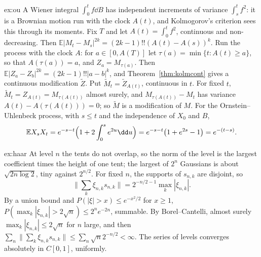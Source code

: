 \begin{solution}{ex:ou}
\idea A Wiener integral $\int_0^tf\dd B$ has independent increments of variance $\int_s^tf^2$: it is a Brownian motion run with the clock $A(t)$, and Kolmogorov's criterion sees this through its moments.
\writeup Fix $T$ and let $A(t)=\int_0^tf^2$, continuous and non-decreasing. Then $\mathbb E|M_t-M_s|^{2k}=(2k-1)!!(A(t)-A(s))^k$. Run the process with the clock $A$: for $a\in[0,A(T)]$ let
$\tau(a)=\min\{t:A(t)\ge a\}$, so that $A(\tau(a))=a$, and $Z_a=M_{\tau(a)}$. Then $\mathbb E|Z_a-Z_b|^{2k}=(2k-1)!!|a-b|^k$, and Theorem~\ref{thm:kolmcont} gives a continuous modification $\tilde Z$. Put
$\tilde M_t=\tilde Z_{A(t)}$, continuous in $t$. For fixed $t$, $\tilde M_t=Z_{A(t)}=M_{\tau(A(t))}$ almost surely, and $M_{\tau(A(t))}-M_t$ has variance $A(t)-A(\tau(A(t)))=0$; so $\tilde M$ is a modification of $M$.
For the Ornstein--Uhlenbeck process, with $s\le t$ and the independence of $X_0$ and $B$,
\[
\mathbb E X_sX_t=e^{-s-t}\Bigl(1+2\int_0^se^{2u}\dd u\Bigr)=e^{-s-t}\bigl(1+e^{2s}-1\bigr)=e^{-(t-s)}.
\]
\end{solution}

\begin{solution}{ex:haar}
\idea At level $n$ the tents do not overlap, so the norm of the level is the largest coefficient times the height of one tent; the largest of $2^n$ Gaussians is about $\sqrt{2n\log2}$, tiny against $2^{n/2}$.
\writeup For fixed $n$, the supports of $s_{n,k}$ are disjoint, so
\[
\|\sum_k\xi_{n,k}s_{n,k}\|=2^{-n/2-1}\max_k|\xi_{n,k}|.
\]
By a union bound and $P(|\xi|>x)\le e^{-x^2/2}$ for $x\ge1$,
$P(\max_k|\xi_{n,k}|>2\sqrt n)\le2^ne^{-2n}$, summable. By Borel--Cantelli, almost surely $\max_k|\xi_{n,k}|\le2\sqrt n$ for $n$ large, and then $\sum_n\|\sum_k\xi_{n,k}s_{n,k}\|\le\sum_n\sqrt n2^{-n/2}<\infty$. The series of levels
converges absolutely in $C[0,1]$, uniformly.
\end{solution}

